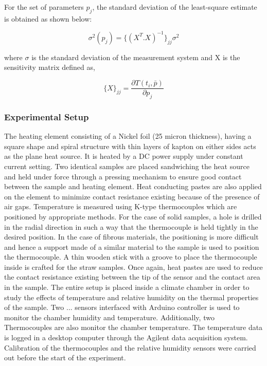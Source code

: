 \documentclass[]{article}
\begin{document}
 For the set of parameters \(p_j\), the standard deviation of the
least-square estimate is obtained as shown below:

\[\sigma^2(p_j) = \{(X^T.X)^{-1}\}_{jj}\sigma^2\]

where \(\sigma\) is the standard deviation of the measurement system and
X is the sensitivity matrix defined as,

\[\{X\}_{jj} = \frac{\partial T(t_i, \bar{p})}{\partial p_j}\]

\hypertarget{header-n53}{%
\subsubsection{Experimental Setup}\label{header-n53}}

 The heating element consisting of a Nickel foil (25 micron thickness),
having a square shape and spiral structure with thin layers of kapton on
either sides acts as the plane heat source. It is heated by a DC power
supply under constant current setting. Two identical samples are placed
sandwiching the heat source and held under force through a pressing
mechanism to ensure good contact between the sample and heating element.
Heat conducting pastes are also applied on the element to minimize
contact resistance existing because of the presence of air gaps.
Temperature is measured using K-type thermocouples which are positioned
by appropriate methods. For the case of solid samples, a hole is drilled
in the radial direction in such a way that the thermocouple is held
tightly in the desired position. In the case of fibrous materials, the
positioning is more difficult and hence a support made of a similar
material to the sample is used to position the thermocouple. A thin
wooden stick with a groove to place the thermocouple inside is crafted
for the straw samples. Once again, heat pastes are used to reduce the
contact resistance existing between the tip of the sensor and the
contact area in the sample. The entire setup is placed inside a climate
chamber in order to study the effects of temperature and relative
humidity on the thermal properties of the sample. Two ... sensors
interfaced with Arduino controller is used to monitor the chamber
humidity and temperature. Additionally, two Thermocouples are also
monitor the chamber temperature. The temperature data is logged in a
desktop computer through the Agilent data acquisition system.
Calibration of the thermocouples and the relative humidity sensors were
carried out before the start of the experiment.\\
\end{document}
